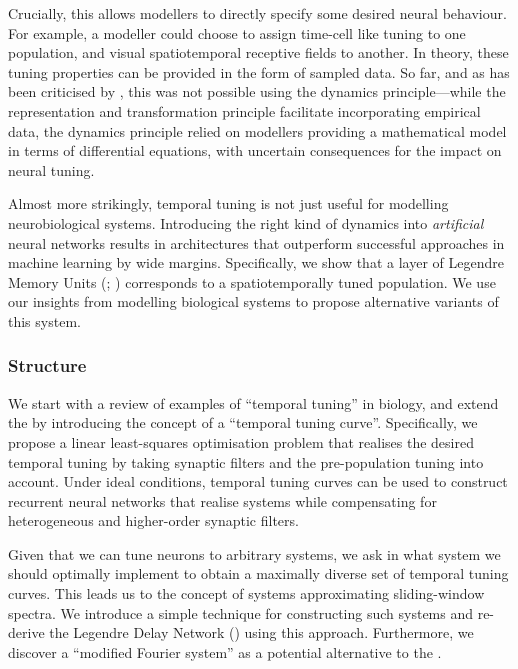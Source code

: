 Crucially, this allows modellers to directly specify some desired neural behaviour.
For example, a modeller could choose to assign time-cell like tuning \citep{pastalkova2008internally,tiganj2016sequential} to one population, and visual spatiotemporal receptive fields \citep{carandini1999linearity} to another.
In theory, these tuning properties can be provided in the form of sampled data.
So far, and as has been criticised by \citep{nicola2017supervised}, this was not possible using the \NEF dynamics principle---while the representation and transformation principle facilitate incorporating empirical data, the dynamics principle relied on modellers providing a mathematical model in terms of differential equations, with uncertain consequences for the impact on neural tuning.

Almost more strikingly, temporal tuning is not just useful for modelling neurobiological systems.
Introducing the right kind of dynamics into \emph{artificial} neural networks results in architectures that outperform successful approaches in machine learning by wide margins.
Specifically, we show that a layer of Legendre Memory Units (\LMUpl; \cite{voelker2019lmu}) corresponds to a spatiotemporally tuned \NEF population. We use our insights from modelling biological systems to propose alternative variants of this system.

\subsubsection{Structure}
We start  with a review of examples of \enquote{temporal tuning} in biology, and extend the \NEF by introducing the concept of a \enquote{temporal tuning curve}.
Specifically, we propose a linear least-squares optimisation problem that realises the desired temporal tuning by taking synaptic filters and the pre-population tuning into account.
Under ideal conditions, temporal tuning curves can be used to construct recurrent neural networks that realise \LTI systems while compensating for heterogeneous and higher-order synaptic filters.

Given that we can tune neurons to arbitrary \LTI systems, we ask in  what \LTI system we should optimally implement to obtain a maximally diverse set of temporal tuning curves.
This leads us to the concept of \LTI systems approximating sliding-window spectra.
We introduce a simple technique for constructing such \LTI systems and re-derive the Legendre Delay Network (\LDN) using this approach.
Furthermore, we discover a \enquote{modified Fourier system} as a potential alternative to the \LDN.

